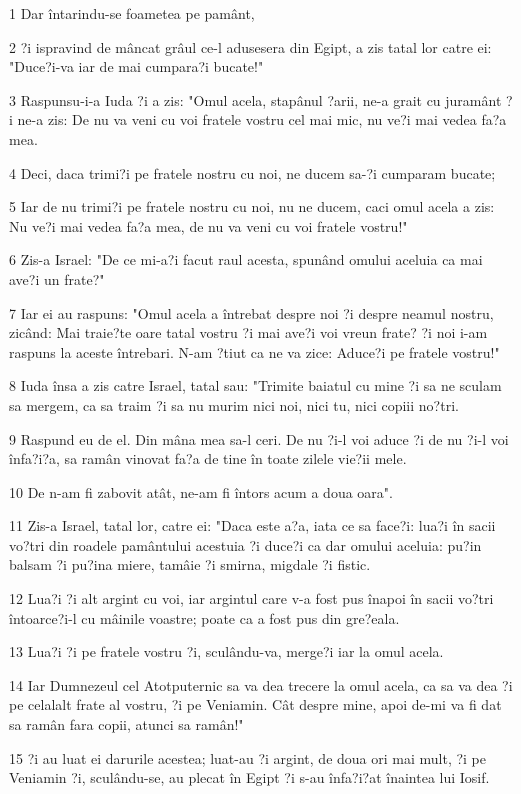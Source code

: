 \par 1 Dar întarindu-se foametea pe pamânt,
\par 2 ?i ispravind de mâncat grâul ce-l adusesera din Egipt, a zis tatal lor catre ei: "Duce?i-va iar de mai cumpara?i bucate!"
\par 3 Raspunsu-i-a Iuda ?i a zis: "Omul acela, stapânul ?arii, ne-a grait cu juramânt ?i ne-a zis: De nu va veni cu voi fratele vostru cel mai mic, nu ve?i mai vedea fa?a mea.
\par 4 Deci, daca trimi?i pe fratele nostru cu noi, ne ducem sa-?i cumparam bucate;
\par 5 Iar de nu trimi?i pe fratele nostru cu noi, nu ne ducem, caci omul acela a zis: Nu ve?i mai vedea fa?a mea, de nu va veni cu voi fratele vostru!"
\par 6 Zis-a Israel: "De ce mi-a?i facut raul acesta, spunând omului aceluia ca mai ave?i un frate?"
\par 7 Iar ei au raspuns: "Omul acela a întrebat despre noi ?i despre neamul nostru, zicând: Mai traie?te oare tatal vostru ?i mai ave?i voi vreun frate? ?i noi i-am raspuns la aceste întrebari. N-am ?tiut ca ne va zice: Aduce?i pe fratele vostru!"
\par 8 Iuda însa a zis catre Israel, tatal sau: "Trimite baiatul cu mine ?i sa ne sculam sa mergem, ca sa traim ?i sa nu murim nici noi, nici tu, nici copiii no?tri.
\par 9 Raspund eu de el. Din mâna mea sa-l ceri. De nu ?i-l voi aduce ?i de nu ?i-l voi înfa?i?a, sa ramân vinovat fa?a de tine în toate zilele vie?ii mele.
\par 10 De n-am fi zabovit atât, ne-am fi întors acum a doua oara".
\par 11 Zis-a Israel, tatal lor, catre ei: "Daca este a?a, iata ce sa face?i: lua?i în sacii vo?tri din roadele pamântului acestuia ?i duce?i ca dar omului aceluia: pu?in balsam ?i pu?ina miere, tamâie ?i smirna, migdale ?i fistic.
\par 12 Lua?i ?i alt argint cu voi, iar argintul care v-a fost pus înapoi în sacii vo?tri întoarce?i-l cu mâinile voastre; poate ca a fost pus din gre?eala.
\par 13 Lua?i ?i pe fratele vostru ?i, sculându-va, merge?i iar la omul acela.
\par 14 Iar Dumnezeul cel Atotputernic sa va dea trecere la omul acela, ca sa va dea ?i pe celalalt frate al vostru, ?i pe Veniamin. Cât despre mine, apoi de-mi va fi dat sa ramân fara copii, atunci sa ramân!"
\par 15 ?i au luat ei darurile acestea; luat-au ?i argint, de doua ori mai mult, ?i pe Veniamin ?i, sculându-se, au plecat în Egipt ?i s-au înfa?i?at înaintea lui Iosif.
